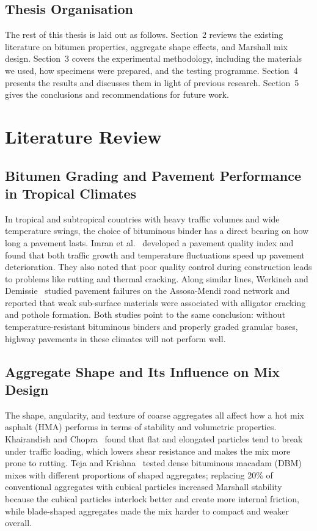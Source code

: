 \documentclass[12pt,a4paper]{article}
\begin{document}
\subsection{Thesis Organisation}

The rest of this thesis is laid out as follows. Section~2 reviews the existing literature on bitumen properties, aggregate shape effects, and Marshall mix design. Section~3 covers the experimental methodology, including the materials we used, how specimens were prepared, and the testing programme. Section~4 presents the results and discusses them in light of previous research. Section~5 gives the conclusions and recommendations for future work.



\section{Literature Review}

\subsection{Bitumen Grading and Pavement Performance in Tropical Climates}
In tropical and subtropical countries with heavy traffic volumes and wide temperature swings, the choice of bituminous binder has a direct bearing on how long a pavement lasts. Imran et al.~\cite{imran2025developing} developed a pavement quality index and found that both traffic growth and temperature fluctuations speed up pavement deterioration. They also noted that poor quality control during construction leads to problems like rutting and thermal cracking. Along similar lines, Werkineh and Demissie~\cite{werkineh2020assessment} studied pavement failures on the Assosa-Mendi road network and reported that weak sub-surface materials were associated with alligator cracking and pothole formation. Both studies point to the same conclusion: without temperature-resistant bituminous binders and properly graded granular bases, highway pavements in these climates will not perform well.

\subsection{Aggregate Shape and Its Influence on Mix Design}
The shape, angularity, and texture of coarse aggregates all affect how a hot mix asphalt (HMA) performs in terms of stability and volumetric properties. Khairandish and Chopra~\cite{khairandish2020influence} found that flat and elongated particles tend to break under traffic loading, which lowers shear resistance and makes the mix more prone to rutting. Teja and Krishna~\cite{teja2020effect} tested dense bituminous macadam (DBM) mixes with different proportions of shaped aggregates; replacing 20\% of conventional aggregates with cubical particles increased Marshall stability because the cubical particles interlock better and create more internal friction, while blade-shaped aggregates made the mix harder to compact and weaker overall.
\end{document}
